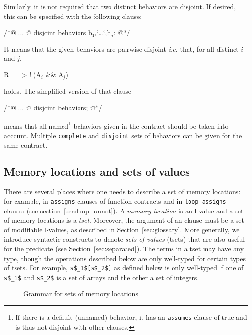 Similarly, it is not required that two distinct behaviors are disjoint.
If desired, this can be specified with the following clause:
\begin{listing-nonumber}
/*@ ...
  @ disjoint behaviors b$_1$,`\dots`,b$_n$;
  @*/
\end{listing-nonumber}
It means that the given behaviors are pairwise disjoint \emph{i.e.}
that, for all distinct $i$ and $j$,
\begin{listing-nonumber}
R ==> ! (A$_i$ && A$_j$)
\end{listing-nonumber}
holds.
The simplified version of that clause
\begin{listing-nonumber}
/*@ ...
  @ disjoint behaviors;
  @*/
\end{listing-nonumber}
means that all named\footnote{If there is a default (unnamed) behavior, it has an 
\lstinline|assumes| clause of true and is thus not disjoint with other clauses.} behaviors given in the contract should be taken into account.
Multiple \lstinline|complete| and \lstinline|disjoint| sets of behaviors can
be given for the same contract.

\subsection{Memory locations and sets of values}
\label{sec:locations}

There are several places where one needs to describe a set of memory
locations: for example, in \lstinline|assigns| clauses of function contracts and
in \lstinline|loop assigns| clauses (see section~\ref{sec:loop_annot}).
A \emph{memory location} is an
l-value and a set of memory locations is a \emph{tset}. 
Moreover, the argument of
an \assigns{} clause must be a set of modifiable l-values, as described in
Section~\ref{sec:glossary}. 
More generally, we introduce syntactic constructs to denote \emph{sets of
  values} (tsets) that are also useful for the \separated predicate (see Section~\ref{sec:separated}). The terms in a tset may have any type, though the operations described below are only well-typed for certain types of tsets. For example, \lstinline|s$_1$[s$_2$]| as defined below is only well-typed if one of 
\lstinline|s$_1$| and \lstinline|s$_2$| is a set of arrays and the other a set of integers.

\begin{figure}
  \begin{cadre}
      
    \end{cadre}
  \caption{Grammar for sets of memory locations}
\label{fig:gram:locations}
\end{figure}

